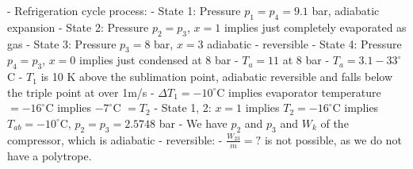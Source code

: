 - Refrigeration cycle process:
- State 1: Pressure \( p_1 = p_4 = 9.1 \) bar, adiabatic expansion
- State 2: Pressure \( p_2 = p_3 \), \( x = 1 \) implies just completely evaporated as gas
- State 3: Pressure \( p_3 = 8 \) bar, \( x = 3 \) adiabatic - reversible
- State 4: Pressure \( p_4 = p_3 \), \( x = 0 \) implies just condensed at 8 bar
- \( T_a = 11 \) at 8 bar
- \( T_a = 3.1 - 33^\circ \)C
- \( T_1 \) is 10 K above the sublimation point, adiabatic reversible and falls below the triple point at over 1m/s
- \( \Delta T_1 = -10^\circ \)C implies evaporator temperature \( = -16^\circ \)C implies \( -7^\circ \)C \( = T_2 \)
- State 1, 2: \( x = 1 \) implies \( T_2 = -16^\circ \)C implies \( T_{ab} = -10^\circ \)C, \( p_2 = p_3 = 2.5748 \) bar
- We have \( p_2 \) and \( p_3 \) and \( W_k \) of the compressor, which is adiabatic - reversible:
- \( \frac{W_{23}}{\dot{m}} = ? \) is not possible, as we do not have a polytrope.